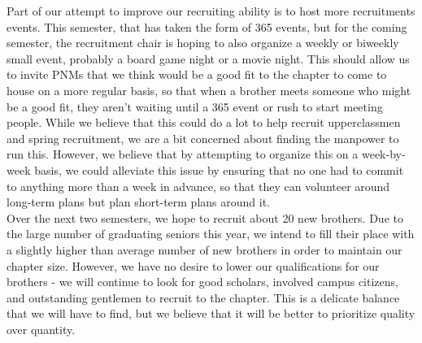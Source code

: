     Part of our attempt to improve our recruiting ability is to host more recruitments events. This semester, that has taken the form of 365 events, but for the coming semester, the recruitment chair is hoping to also organize a weekly or biweekly small event, probably a board game night or a movie night. This should allow us to invite PNMs that we think would be a good fit to the chapter to come to house on a more regular basis, so that when a brother meets someone who might be a good fit, they aren’t waiting until a 365 event or rush to start meeting people. While we believe that this could do a lot to help recruit upperclassmen and spring recruitment, we are a bit concerned about finding the manpower to run this. However, we believe that by attempting to organize this on a week-by-week basis, we could alleviate this issue by ensuring that no one had to commit to anything more than a week in advance, so that they can volunteer around long-term plans but plan short-term plans around it. \\
    
    Over the next two semesters, we hope to recruit about 20 new brothers. Due to the large number of graduating seniors this year, we intend to fill their place with a slightly higher than average number of new brothers in order to maintain our chapter size. However, we have no desire to lower our qualifications for our brothers - we will continue to look for good scholars, involved campus citizens, and outstanding gentlemen to recruit to the chapter. This is a delicate balance that we will have to find, but we believe that it will be better to prioritize quality over quantity.

